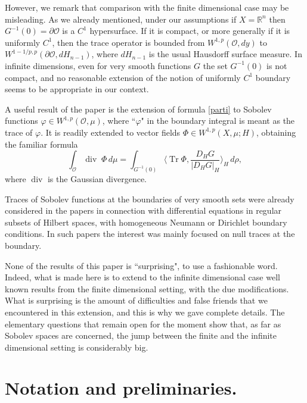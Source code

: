 \documentclass[reqno,twoside,12pt]{amsart}
\begin{document}
However, we remark that comparison with the finite dimensional case may be misleading. As we already mentioned, under our assumptions if $X={\mathbb R}^n$  then $G^{-1}(0)= \partial {\mathcal O}$ is a $C^1$ hypersurface. If it is compact, or more generally if it is uniformly $C^1$, then the trace operator is bounded from $ W^{1,p}({\mathcal O}, dy) $ to $ W^{1-1/p,p}(\partial {\mathcal O}, dH_{n-1})$, where $dH_{n-1}$ is the usual Hausdorff surface measure. In infinite dimensions, even for very smooth functions $G$ the set $G^{-1}(0)$ is not compact, and  no reasonable extension of the notion of uniformly $C^1$ boundary seems to be appropriate in our context. 

A useful result of the paper is the extension of formula \eqref{parti} to Sobolev functions $\varphi\in W^{1,p}({\mathcal O}, \mu)$, where ``$\varphi$" in the boundary integral is meant as the trace of $\varphi$. It is readily extended to vector fields $\Phi\in W^{1,p}(X, \mu; H)$, obtaining the familiar formula
\begin{equation}
\label{campi}
\int_{\mathcal O} {\operatorname{div}}\;\Phi\, d\mu = \int_{G^{-1}(0)}\langle {\operatorname{Tr}}  \Phi ,  \frac{ D_HG}{|D_HG|_H}\rangle_H \,d\rho ,
\end{equation}
 where ${\operatorname{div}}$ is the Gaussian divergence.  

Traces of Sobolev functions at the boundaries of very smooth sets were already considered in the papers \cite{BDPT1,BDPT2,DPL,DPL2,AVN} in connection with differential equations  in regular subsets of Hilbert spaces, with homogeneous Neumann or Dirichlet boundary conditions. In such papers the interest was mainly focused on   null traces at the boundary. 

None of the results of this paper is ``surprising", to use a fashionable word. Indeed, what is made here is to extend to the infinite dimensional case well known results from the finite dimensional setting, with the due modifications. 
What is surprising is the amount of difficulties and false friends that we encountered in this extension, and this is why we gave complete details. 
The  elementary  questions that remain open for the moment show that, as far as Sobolev spaces are concerned,  the jump between the  finite and the infinite dimensional setting is considerably big.   

\section{Notation and preliminaries.}
\label{Notation and preliminaries}
 
\end{document}
